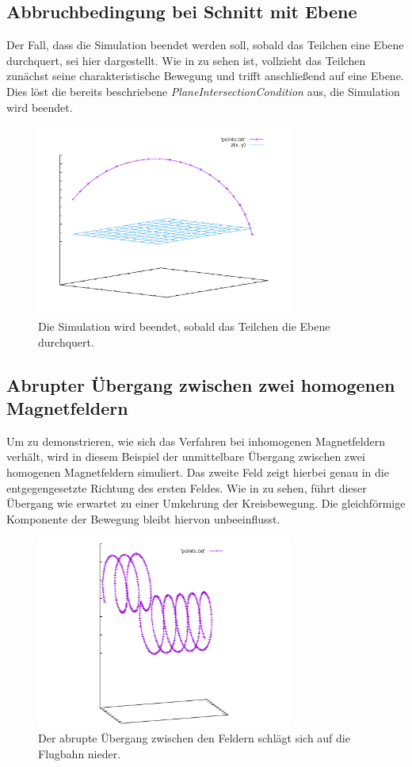 \subsection{Abbruchbedingung bei Schnitt mit Ebene}

Der Fall, dass die Simulation beendet werden soll, sobald das Teilchen eine Ebene durchquert, sei hier dargestellt. Wie in
 zu sehen ist, vollzieht das Teilchen zun\"achst seine charakteristische Bewegung und trifft anschlie{\ss}end
auf eine Ebene. Dies l\"ost die bereits beschriebene \textit{PlaneIntersectionCondition} aus, die Simulation wird beendet.

\begin{figure}[h]
  \label{fig:stop_plane}
  \centering
  \includegraphics[width=0.75\textwidth]{gnuplot/stop_plane}
  \caption{Die Simulation wird beendet, sobald das Teilchen die Ebene durchquert.}
\end{figure}

\subsection{Abrupter \"Ubergang zwischen zwei homogenen Magnetfeldern}

Um zu demonstrieren, wie sich das Verfahren bei inhomogenen Magnetfeldern verh\"alt, wird in diesem Beispiel der unmittelbare
\"Ubergang zwischen zwei homogenen Magnetfeldern simuliert. Das zweite Feld zeigt hierbei genau in die entgegengesetzte Richtung
des ersten Feldes. Wie in  zu sehen, f\"uhrt dieser \"Ubergang wie erwartet zu einer Umkehrung der
Kreisbewegung. Die gleichf\"ormige Komponente der Bewegung bleibt hiervon unbeeinflusst.

\begin{figure}[h]
  \label{fig:two_fields}
  \centering
  \includegraphics[width=0.75\textwidth]{gnuplot/two_fields}
  \caption{Der abrupte \"Ubergang zwischen den Feldern schl\"agt sich auf die Flugbahn nieder.}
\end{figure}
